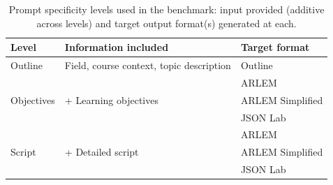 \begin{table}[htbp]
    \centering
    \small
    \caption{Prompt specificity levels used in the benchmark: input provided (additive across levels) and target output format(s) generated at each.}
    \label{tab:prompt-levels}
    \begin{tabular}{@{} l l l @{}}
        \toprule
        \textbf{Level} & \textbf{Information included} & \textbf{Target format} \\
        \midrule
        Outline & Field, course context, topic description & Outline \\
        \midrule
        \multirow{3}{*}{Objectives} & \multirow{3}{*}{+ Learning objectives} & ARLEM \\
         & & ARLEM Simplified \\
         & & JSON Lab \\
        \midrule
        \multirow{3}{*}{Script} & \multirow{3}{*}{+ Detailed script} & ARLEM \\
         & & ARLEM Simplified \\
         & & JSON Lab \\
        \bottomrule
    \end{tabular}
\end{table}
